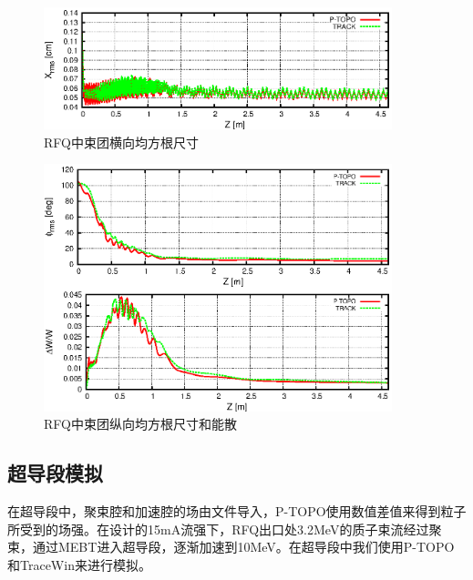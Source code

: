 \begin{figure}[!htb]
    \centering
    \includegraphics[width=0.9\textwidth]{Img/ADS_RFQ_size1.eps}
    \caption{RFQ中束团横向均方根尺寸}
    \label{fig:ADS_RFQ_size1}
\end{figure}

\begin{figure}[!htb]
    \centering
    \includegraphics[width=0.9\textwidth]{Img/ADS_RFQ_size2.eps}
    \caption{RFQ中束团纵向均方根尺寸和能散}
    \label{fig:ADS_RFQ_size2}
\end{figure}

\subsection{超导段模拟}
在超导段中，聚束腔和加速腔的场由文件导入，P-TOPO使用数值差值来得到粒子所受到的场强。在设计的15mA流强下，RFQ出口处3.2MeV的质子束流经过聚束，通过MEBT进入超导段，逐渐加速到10MeV。在超导段中我们使用P-TOPO和TraceWin来进行模拟。

